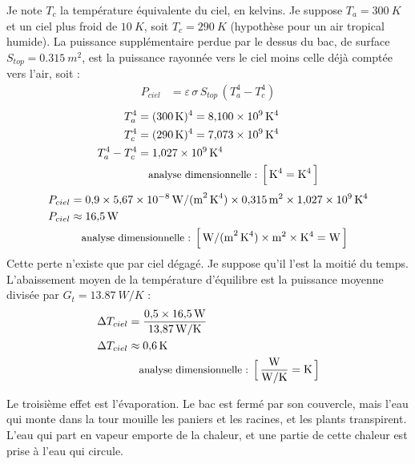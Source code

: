 \begin{demonstration}
Je note $T_c$ la température équivalente du ciel, en kelvins. Je suppose $T_a = \qty{300}{K}$ et un ciel plus froid de $\qty{10}{K}$, soit $T_c = \qty{290}{K}$ (hypothèse pour un air tropical humide). La puissance supplémentaire perdue par le dessus du bac, de surface $S_{top} = \qty{0,315}{m^2}$, est la puissance rayonnée vers le ciel moins celle déjà comptée vers l'air, soit :
\begin{align*}
P_{ciel} &= \varepsilon\,\sigma\,S_{top}\,\left(T_a^4 - T_c^4\right)
\end{align*}
\begin{align*}
T_a^4 &= (\qty{300}{K})^4 = \qty{8,100e9}{K^4}\\
T_c^4 &= (\qty{290}{K})^4 = \qty{7,073e9}{K^4}\\
T_a^4 - T_c^4 &= \qty{1,027e9}{K^4}\\
\dimline{\unit{K}^4=\unit{K^4}}
\end{align*}
\begin{align*}
P_{ciel} &= 0{,}9 \times \qty{5,67e-8}{W/(m^2\,K^4)} \times \qty{0,315}{m^2} \times \qty{1,027e9}{K^4}\\
P_{ciel} &\approx \qty{16,5}{W}\\
\dimline{\unit{W/(m^2\,K^4)}\times\unit{m^2}\times\unit{K^4}=\unit{W}}
\end{align*}
Cette perte n'existe que par ciel dégagé. Je suppose qu'il l'est la moitié du temps. L'abaissement moyen de la température d'équilibre est la puissance moyenne divisée par $G_t = \qty{13,87}{W/K}$ :
\begin{align*}
\Delta T_{ciel} &= \frac{0{,}5 \times \qty{16,5}{W}}{\qty{13,87}{W/K}}\\
\Delta T_{ciel} &\approx \qty{0,6}{K}\\
\dimline{\dfrac{\unit{W}}{\unit{W/K}}=\unit{K}}
\end{align*}
\end{demonstration}

Le troisième effet est l'évaporation. Le bac est fermé par son couvercle, mais l'eau qui monte dans la tour mouille les paniers et les racines, et les plants transpirent. L'eau qui part en vapeur emporte de la chaleur, et une partie de cette chaleur est prise à l'eau qui circule.

